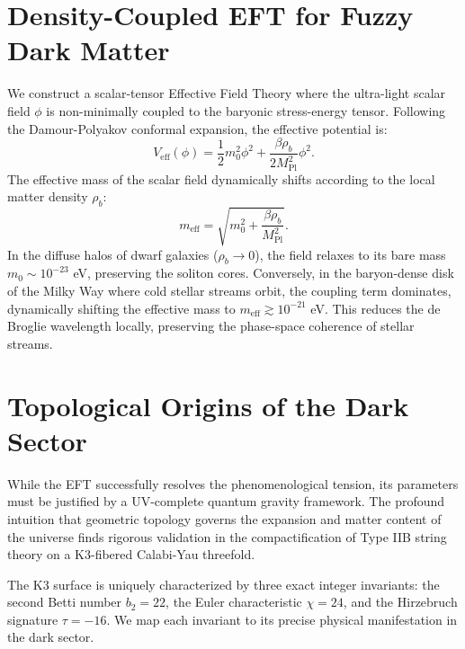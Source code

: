 \documentclass[11pt,a4paper]{article}
\begin{document}
\section{Density-Coupled EFT for Fuzzy Dark Matter}
We construct a scalar-tensor Effective Field Theory where the ultra-light scalar field $\phi$ is non-minimally coupled to the baryonic stress-energy tensor. Following the Damour-Polyakov conformal expansion, the effective potential is:
\begin{equation}
    V_{\text{eff}}(\phi) = \frac{1}{2}m_0^2 \phi^2 + \frac{\beta \rho_b}{2 M_{\text{Pl}}^2} \phi^2.
\end{equation}
The effective mass of the scalar field dynamically shifts according to the local matter density $\rho_b$:
\begin{equation}
    m_{\text{eff}} = \sqrt{m_0^2 + \frac{\beta \rho_b}{M_{\text{Pl}}^2}}.
\end{equation}
In the diffuse halos of dwarf galaxies ($\rho_b \to 0$), the field relaxes to its bare mass $m_0 \sim 10^{-23}$ eV, preserving the soliton cores. Conversely, in the baryon-dense disk of the Milky Way where cold stellar streams orbit, the coupling term dominates, dynamically shifting the effective mass to $m_{\text{eff}} \gtrsim 10^{-21}$ eV. This reduces the de Broglie wavelength locally, preserving the phase-space coherence of stellar streams.

\section{Topological Origins of the Dark Sector}
While the EFT successfully resolves the phenomenological tension, its parameters must be justified by a UV-complete quantum gravity framework. The profound intuition that geometric topology governs the expansion and matter content of the universe finds rigorous validation in the compactification of Type IIB string theory on a K3-fibered Calabi-Yau threefold. 

The K3 surface is uniquely characterized by three exact integer invariants: the second Betti number $b_2 = 22$, the Euler characteristic $\chi = 24$, and the Hirzebruch signature $\tau = -16$. We map each invariant to its precise physical manifestation in the dark sector.
\end{document}
